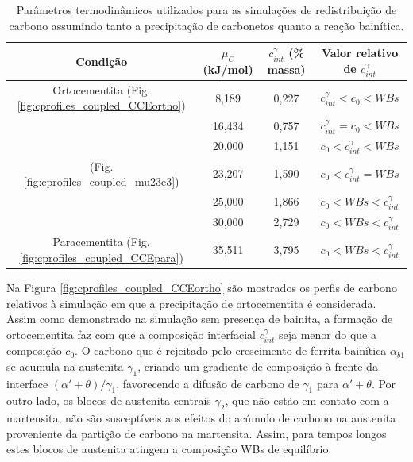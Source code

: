 \begin{table}
  \centering
  \caption{Parâmetros termodinâmicos utilizados para as simulações de redistribuição de carbono assumindo tanto a precipitação de carbonetos quanto a reação bainítica.}
  \begin{tabular}{cccc}
    \hline
    Condição & $\mu_C$ (kJ/mol) & $c^\gamma_{int}$ (\% massa) & Valor relativo de $c^\gamma_{int}$\\
    \hline
    Ortocementita (Fig. \ref{fig:cprofiles_coupled_CCEortho}) & 8,189 & 0,227 & $c^\gamma_{int} < c_0 < WBs$ \\
    & 16,434 & 0,757 & $c^\gamma_{int} = c_0 < WBs$ \\
    & 20,000 & 1,151 & $c_0 < c^\gamma_{int} < WBs$ \\
    (Fig. \ref{fig:cprofiles_coupled_mu23e3}) & 23,207 & 1,590 & $c_0 < c^\gamma_{int} = WBs$ \\
    & 25,000 & 1,866 & $c_0 < WBs < c^\gamma_{int}$ \\
    & 30,000 & 2,729 & $c_0 < WBs < c^\gamma_{int}$ \\
    Paracementita (Fig. \ref{fig:cprofiles_coupled_CCEpara}) & 35,511 & 3,795 & $c_0 < WBs < c^\gamma_{int}$ \\
    \hline
  \end{tabular}
  \label{tab:cpartition_bainite_CCEtheta}
\end{table}

Na Figura \ref{fig:cprofiles_coupled_CCEortho} são mostrados os perfis de carbono relativos à simulação em que a precipitação de ortocementita é considerada. Assim como demonstrado na simulação sem presença de bainita, a formação de ortocementita faz com que a composição interfacial $c^\gamma_{int}$ seja menor do que a composição $c_0$. O carbono que é rejeitado pelo crescimento de ferrita bainítica $\alpha_{b1}$ se acumula na austenita $\gamma_1$, criando um gradiente de composição à frente da interface $(\alpha' + \theta)/\gamma_1$, favorecendo a difusão de carbono de $\gamma_1$ para $\alpha' + \theta$. Por outro lado, os blocos de austenita centrais $\gamma_2$, que não estão em contato com a martensita, não são susceptíveis aos efeitos do acúmulo de carbono na austenita proveniente da partição de carbono na martensita. Assim, para tempos longos estes blocos de austenita atingem a composição WBs de equilíbrio.

